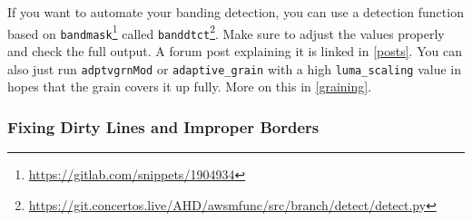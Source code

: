 \documentclass{scrartcl}
\begin{document}
If you want to automate your banding detection, you can use a detection function based on \texttt{bandmask}\footnote{\url{https://gitlab.com/snippets/1904934}} called \texttt{banddtct}\footnote{\url{https://git.concertos.live/AHD/awsmfunc/src/branch/detect/detect.py}}.  Make sure to adjust the values properly and check the full output.  A forum post explaining it is linked in \ref{posts}.  You can also just run \texttt{adptvgrnMod} or \texttt{adaptive\_grain} with a high \texttt{luma\_scaling} value in hopes that the grain covers it up fully.  More on this in \ref{graining}.

\subsubsection{Fixing Dirty Lines and Improper Borders}
\end{document}
